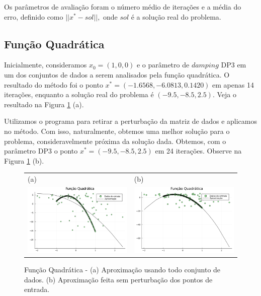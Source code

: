 \documentclass[12pt,a4paper]{article}
\begin{document}
	Os parâmetros de avaliação foram o número médio de iterações e a média do erro, definido como $||x^*-sol||,$ onde $sol$ é a solução real do problema.
	
	\subsection{Função Quadrática}\label{quad}
	Inicialmente, consideramos $x_0 = (1, 0, 0)$ e o parâmetro de $damping$ DP3 em um dos conjuntos de dados a serem analisados pela função quadrática. O resultado do método foi o ponto $x^* = (-1.6568, -6.0813, 0.1420)$ em apenas 14 iterações, enquanto a solução real do problema é $(-9.5, -8.5, 2.5).$ Veja o resultado na Figura \ref{fig1} (a).
	
	Utilizamos o programa para retirar a perturbação da matriz de dados e aplicamos no método. Com isso, naturalmente,  obtemos uma melhor solução  para o problema, consideravelmente próxima da solução dada. Obtemos, com o parâmetro DP3 o ponto $x^* = (-9.5, -8.5, 2.5)$ em 24 iterações. Observe na Figura \ref{fig1} (b).
	
		\begin{figure}[H]
		\centering 
		\begin{tabular}{ll}
			
			(a)& (b)   \\
			
			\includegraphics[width=0.45\linewidth]{Q1.png} & \includegraphics[width=0.45\linewidth]{Q2.png}\\ 
			
		\end{tabular}
		\caption{Função Quadrática - (a) Aproximação usando todo conjunto de dados. (b) Aproximação feita sem perturbação dos pontos de entrada.}
		\label{fig1}
	\end{figure}
\end{document}
